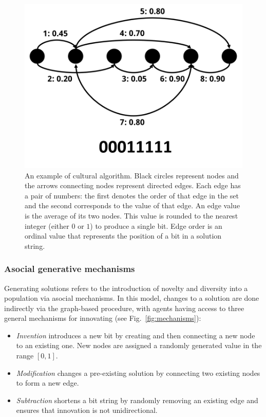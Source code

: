 \documentclass{article}
\begin{document}
\begin{figure}[H]
\begin{center}
    \includegraphics[width=\linewidth]{algorithm.png}
\end{center}
    \caption{An example of cultural algorithm. Black circles represent nodes and the arrows connecting nodes represent directed edges. Each edge has a pair of numbers: the first denotes the order of that edge in the set and the second corresponds to the value of that edge. An edge value is the average of its two nodes. This value is rounded to the nearest integer (either $0$ or $1$) to produce a single bit. Edge order is an ordinal value that represents the position of a bit in a solution string.}
    \label{fig:algorithm}
\end{figure}

\subsubsection{Asocial generative mechanisms}
Generating solutions refers to the introduction of novelty and diversity into a population via asocial mechanisms. In this model, changes to a solution are done indirectly via the graph-based procedure, with agents having access to three general mechanisms for innovating (see Fig.~\ref{fig:mechanisms}):

\begin{itemize}
    \item {\em Invention} introduces a new bit by creating and then connecting a new node to an existing one. New nodes are assigned a randomly generated value in the range $[0,1]$.
    \item {\em Modification} changes a pre-existing solution by connecting two existing nodes to form a new edge. 
    \item {\em Subtraction} shortens a bit string by randomly removing an existing edge and ensures that innovation is not unidirectional.
\end{itemize}
\end{document}

